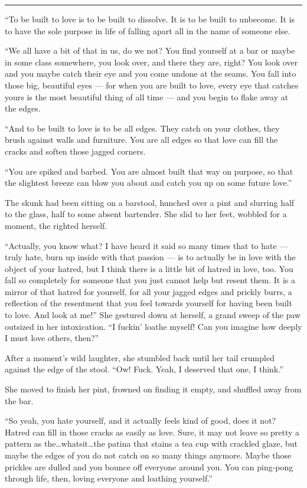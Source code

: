 \begin{center}\rule{0.5\linewidth}{0.5pt}\end{center}

``To be built to love is to be built to dissolve. It is to be built to unbecome. It is to have the sole purpose in life of falling apart all in the name of someone else.

``We all have a bit of that in us, do we not? You find yourself at a bar or maybe in some class somewhere, you look over, and there they are, right? You look over and you maybe catch their eye and you come undone at the seams. You fall into those big, beautiful eyes — for when you are built to love, every eye that catches yours is the most beautiful thing of all time — and you begin to flake away at the edges.

``And to be built to love is to be all edges. They catch on your clothes, they brush against walls and furniture. You are all edges so that love can fill the cracks and soften those jagged corners.

``You are spiked and barbed. You are almost built that way on purpose, so that the slightest breeze can blow you about and catch you up on some future love.''

The skunk had been sitting on a barstool, hunched over a pint and slurring half to the glass, half to some absent bartender. She slid to her feet, wobbled for a moment, the righted herself.

``Actually, you know what? I have heard it said so many times that to hate — truly hate, burn up inside with that passion — is to actually be in love with the object of your hatred, but I think there is a little bit of hatred in love, too. You fall so completely for someone that you just cannot help but resent them. It is a mirror of that hatred for yourself, for all your jagged edges and prickly burrs, a reflection of the resentment that you feel towards yourself for having been built to love. And look at me!'' She gestured down at herself, a grand sweep of the paw outsized in her intoxication. ``I fuckin' loathe myself! Can you imagine how deeply I must love others, then?''

After a moment's wild laughter, she stumbled back until her tail crumpled against the edge of the stool. ``Ow! Fuck. Yeah, I deserved that one, I think.''

She moved to finish her pint, frowned on finding it empty, and shuffled away from the bar.

``So yeah, you hate yourself, and it actually feels kind of good, does it not? Hatred can fill in those cracks as easily as love. Sure, it may not leave so pretty a pattern as the\ldots whatsit\ldots the patina that stains a tea cup with crackled glaze, but maybe the edges of you do not catch on so many things anymore. Maybe those prickles are dulled and you bounce off everyone around you. You can ping-pong through life, then, loving everyone and loathing yourself.''

